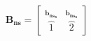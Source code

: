 \documentclass[preview]{standalone}
\begin{document}
\begin{align*}
{\mathbf{B_{ns}} = \begin{bmatrix} \overbrace{1}^{\mathbf{b}_{\mathbf{ns_x}}}& \overbrace{2}^{\mathbf{b}_{\mathbf{ns_x}}} \end{bmatrix}}
\end{align*}
\end{document}
